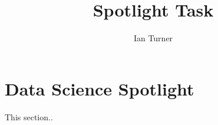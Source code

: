 \documentclass{article}
\title{Spotlight Task}
\author{Ian Turner}
\begin{document}
\maketitle
\section*{Data Science Spotlight}
This section..
\end{document}
